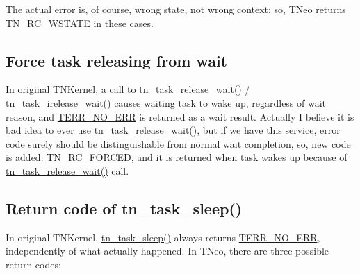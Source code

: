 The actual error is, of course, wrong state, not wrong context; so, T\+Neo returns {\ttfamily \hyperlink{tn__common_8h_aa43bd3da1ad4c1e61224b5f23b369876a7b6d93374f52ba4b2fc01b38b783aa4c}{T\+N\+\_\+\+R\+C\+\_\+\+W\+S\+T\+A\+T\+E}} in these cases.\hypertarget{tnkernel_diff_tnkernel_diff_release_wait}{}\subsection{Force task releasing from wait}\label{tnkernel_diff_tnkernel_diff_release_wait}
In original T\+N\+Kernel, a call to {\ttfamily \hyperlink{tn__tasks_8h_ae90ecdbd7d87d050c2c98ec775e6efc7}{tn\+\_\+task\+\_\+release\+\_\+wait()}} / {\ttfamily \hyperlink{tn__tasks_8h_aee0ef296af18733f64269386adf8a2d7}{tn\+\_\+task\+\_\+irelease\+\_\+wait()}} causes waiting task to wake up, regardless of wait reason, and {\ttfamily \hyperlink{tn__oldsymbols_8h_a71970f860643e62fad7ec03076bdc1d8}{T\+E\+R\+R\+\_\+\+N\+O\+\_\+\+E\+R\+R}} is returned as a wait result. Actually I believe it is bad idea to ever use {\ttfamily \hyperlink{tn__tasks_8h_ae90ecdbd7d87d050c2c98ec775e6efc7}{tn\+\_\+task\+\_\+release\+\_\+wait()}}, but if we have this service, error code surely should be distinguishable from normal wait completion, so, new code is added\+: {\ttfamily \hyperlink{tn__common_8h_aa43bd3da1ad4c1e61224b5f23b369876ae5cbacb0fb01805c9003046c08bf4356}{T\+N\+\_\+\+R\+C\+\_\+\+F\+O\+R\+C\+E\+D}}, and it is returned when task wakes up because of {\ttfamily \hyperlink{tn__tasks_8h_ae90ecdbd7d87d050c2c98ec775e6efc7}{tn\+\_\+task\+\_\+release\+\_\+wait()}} call.\hypertarget{tnkernel_diff_tnkernel_diff_task_sleep}{}\subsection{Return code of tn\+\_\+task\+\_\+sleep()}\label{tnkernel_diff_tnkernel_diff_task_sleep}
In original T\+N\+Kernel, {\ttfamily \hyperlink{tn__tasks_8h_ae768a72ca0efde5767796cc1770bd45e}{tn\+\_\+task\+\_\+sleep()}} always returns {\ttfamily \hyperlink{tn__oldsymbols_8h_a71970f860643e62fad7ec03076bdc1d8}{T\+E\+R\+R\+\_\+\+N\+O\+\_\+\+E\+R\+R}}, independently of what actually happened. In T\+Neo, there are three possible return codes\+:


